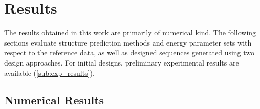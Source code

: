 \documentclass[../../master.tex]{subfiles}
\begin{document}
\section{Results}
\label{sec:results}

The results obtained in this work are primarily of numerical kind.
The following sections evaluate structure prediction methods and energy parameter sets with respect to the reference data, as well as designed sequences generated using two design approaches.
For initial designs, preliminary experimental results are available (\autoref{sub:exp_results}).

\subsection{Numerical Results}
\label{sub:num_results}
\end{document}
